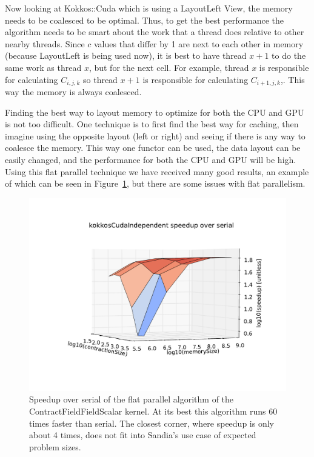Now looking at Kokkos::Cuda which is using a LayoutLeft View, the memory needs to be coalesced to be optimal. Thus, to get the best performance the algorithm needs to be smart about the work that a thread does relative to other nearby threads. Since $c$ values that differ by 1 are next to each other in memory (because LayoutLeft is being used now), it is best to have thread $x+1$ to do the same work as thread $x$, but for the next cell. For example, thread $x$ is responsible for calculating $C_{i, j, k}$ so thread $x+1$ is responsible for calculating $C_{i+1, j, k}$,. This way the memory is always coalesced. 

Finding the best way to layout memory to optimize for both the CPU and GPU is not too difficult. One technique is to first find the best way for caching, then imagine using the opposite layout (left or right) and seeing if there is any way to coalesce the memory. This way one functor can be used, the data layout can be easily changed, and the performance for both the CPU and GPU will be high. Using this flat parallel technique we have received many good results, an example of which can be seen in Figure~\ref{lst:ContractFieldFieldScalar speedup over serial}, but there are some issues with flat parallelism.

\begin{figure}[!ht]
\includegraphics[scale=.8]{CFFS_VersusSerial_kokkosCudaIndependent.pdf}
\caption{Speedup over serial of the flat parallel algorithm of the ContractFieldFieldScalar kernel. At its best this algorithm runs 60 times faster than serial. The closest corner, where speedup is only about 4 times, does not fit into Sandia's use case of expected problem sizes.
\label{lst:ContractFieldFieldScalar speedup over serial}} 
\end{figure}

